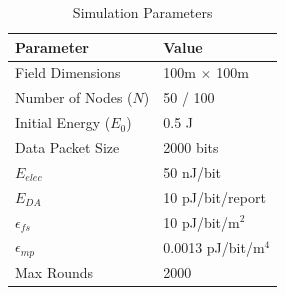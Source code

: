 \begin{table}[h]
\centering
\caption{Simulation Parameters}
\begin{tabular}{|l|l|}
\hline
\textbf{Parameter} & \textbf{Value} \\ \hline
Field Dimensions & 100m $\times$ 100m \\
Number of Nodes ($N$) & 50 / 100 \\
Initial Energy ($E_0$) & 0.5 J \\
Data Packet Size & 2000 bits \\
$E_{elec}$ & 50 nJ/bit \\
$E_{DA}$ & 10 pJ/bit/report \\
$\epsilon_{fs}$ & 10 pJ/bit/m$^2$ \\
$\epsilon_{mp}$ & 0.0013 pJ/bit/m$^4$ \\
Max Rounds & 2000 \\ \hline
\end{tabular}
\end{table}